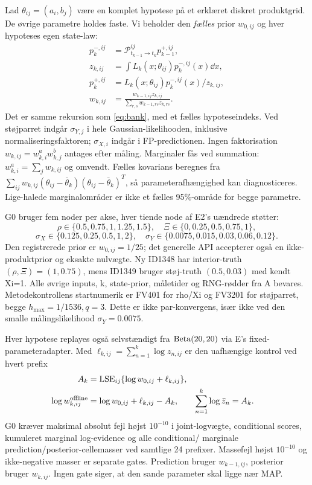 Lad \(\theta_{ij}=(a_i,b_j)\) være en komplet hypotese på et erklæret diskret
produktgrid. De øvrige parametre holdes faste. Vi beholder den \emph{fælles}
prior \(w_{0,ij}\) og hver hypoteses egen state-law:
\begin{align}
 p_k^{-,ij}&=\mathcal P^{ij}_{t_{k-1}\to t_k}p_{k-1}^{+,ij},\\
 z_{k,ij}&=\int L_k(x;\theta_{ij})p_k^{-,ij}(x)\dd x,\\
 p_k^{+,ij}&=L_k(x;\theta_{ij})p_k^{-,ij}(x)/z_{k,ij},\\
 w_{k,ij}&=\frac{w_{k-1,ij}z_{k,ij}}
 {\sum_{r,s}w_{k-1,rs}z_{k,rs}}.
 \label{eq:g0-joint-update}
\end{align}
Det er samme rekursion som \eqref{eq:bank}, med et fælles hypoteseindeks.
Ved støjparret indgår \(\sigma_{Y,j}\) i hele Gaussian-likelihooden, inklusive
normaliseringsfaktoren; \(\sigma_{X,i}\) indgår i FP-predictionen.
Ingen faktorisation \(w_{k,ij}=w_{k,i}^{a}w_{k,j}^{b}\) antages efter måling.
Marginaler fås ved summation: \(w_{k,i}^{a}=\sum_jw_{k,ij}\) og omvendt.
Fælles kovarians beregnes fra \(\sum_{ij}w_{k,ij}(\theta_{ij}-\bar\theta_k)
(\theta_{ij}-\bar\theta_k)^T\), så parameterafhængighed kan diagnosticeres.
Lige-halede marginalområder er ikke et fælles 95\%-område for begge parametre.

G0 bruger fem noder per akse, hver tiende node af E2's uændrede støtter:
\[
 \rho\in\{0.5,0.75,1,1.25,1.5\},\quad
 \Xi\in\{0,0.25,0.5,0.75,1\},
\]
\[
 \sigma_X\in\{0.125,0.25,0.5,1,2\},\quad
 \sigma_Y\in\{0.0075,0.015,0.03,0.06,0.12\}.
\]
Den registrerede prior er \(w_{0,ij}=1/25\); det generelle API accepterer også
en ikke-produktprior og eksakte nulvægte. Ny ID1348 har interior-truth
\((\rho,\Xi)=(1,0.75)\), mens ID1349 bruger støj-truth \((0.5,0.03)\)
med kendt Xi=1. Alle øvrige inputs, k, state-prior, måletider og RNG-rødder
fra A bevares. Metodekontrollens startnumerik er FV401 for rho/Xi og FV3201
for støjparret, begge \(h_{\max}=1/1536,q=3\). Dette er ikke par-konvergens,
især ikke ved den smalle målingslikelihood \(\sigma_Y=0.0075\).

Hver hypotese replayes også selvstændigt fra \(\operatorname{Beta}(20,20)\) via E's
fixed-parameteradapter. Med \(\ell_{k,ij}=\sum_{n=1}^k\log z_{n,ij}\) er
den uafhængige kontrol ved hvert prefix
\begin{align}
 A_k&=\operatorname{LSE}_{ij}\{\log w_{0,ij}+\ell_{k,ij}\},\\
 \log w_{k,ij}^{\rm offline}&=\log w_{0,ij}+\ell_{k,ij}-A_k,
 &\sum_{n=1}^k\log\bar z_n&=A_k.
 \label{eq:g0-offline}
\end{align}
G0 kræver maksimal absolut fejl højst \(10^{-10}\) i joint-logvægte,
conditional scores, kumuleret marginal log-evidence og alle conditional/
marginale prediction/posterior-cellemasser ved samtlige 24 prefixer.
Massefejl højst \(10^{-10}\) og ikke-negative masser er separate gates.
Prediction bruger \(w_{k-1,ij}\), posterior bruger \(w_{k,ij}\).
Ingen gate siger, at den sande parameter skal ligge nær MAP.


